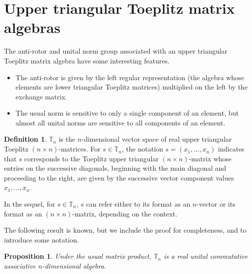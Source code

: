 \documentclass{amsart}
\newtheorem{proposition}[theorem]{Proposition}
\theoremstyle{definition}
\newtheorem{definition}[theorem]{Definition}
\numberwithin{theorem}{section}
\numberwithin{equation}{section}
\begin{document}
\vspace{.75 cm}
 
\appendix


\section{Upper triangular Toeplitz matrix algebras} 

The anti-rotor and unital norm group associated with an upper triangular Toeplitz matrix algebra have some interesting features.
\begin{itemize}\item The anti-rotor is given by the left regular representation (the algebra whose elements are lower triangular Toeplitz matrices) multiplied on the left by the exchange matrix. \item The usual norm is sensitive to only a single component of an element, but almost all unital norms are sensitive to all components of an element.\end{itemize}


 \begin{definition}\label{5/4/22.1} $\mathbb{T}_n$ is the $n$-dimensional vector space of real upper triangular Toeplitz $(n\times n)$-matrices. For $s\in \mathbb{T}_n$, the notation $s=(x_1,\dots,x_n)$ indicates that $s$ corresponds to the Toeplitz upper triangular $(n\times n)$-matrix whose entries on the successive diagonals, beginning with the main diagonal and proceeding to the right, are given by the successive vector component values $x_1,\dots,x_n$.   
\end{definition}

\enlargethispage{1cm}
In the sequel, for $s\in \mathbb{T}_n$, $s$ can refer either to its format as an $n$-vector or its format as an $(n\times n)$-matrix, depending on the context.


The following result is known, but we include the proof for completeness, and to introduce some notation.  



 \begin{proposition}\label{5/10/22.1} Under the usual matrix product, $\mathbb{T}_n$ is a real unital commutative associative $n$-dimensional algebra.\end{proposition} 
 
\end{document}
